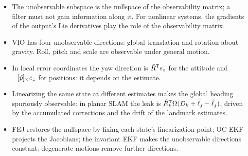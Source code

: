 \begin{takeaways}
\begin{itemize}
  \item The unobservable subspace is the nullspace of the observability matrix; a filter must not gain information along it. For nonlinear
        systems, the gradients of the output's Lie derivatives play the role of the observability matrix.
  \item VIO has four unobservable directions: global translation and rotation about gravity. Roll, pitch and scale are observable
        under general motion.
  \item In local error coordinates the yaw direction is $\hat R^{\mathsf{T}} e_z$ for the attitude and $-[\hat p]_{\times}e_z$ for positions: it depends on
        the estimate.
  \item Linearizing the same state at different estimates makes the global heading spuriously observable: in planar SLAM the leak is
        $\hat R_k^{\mathsf{T}}\Omega(D_k + \bar\ell_j - \hat\ell_j)$, driven by the accumulated corrections and the drift of the landmark estimates.
  \item FEJ restores the nullspace by fixing each state's linearization point; OC-EKF projects the Jacobians; the invariant EKF makes the
        unobservable directions constant; degenerate motions remove further directions.
\end{itemize}
\end{takeaways}


